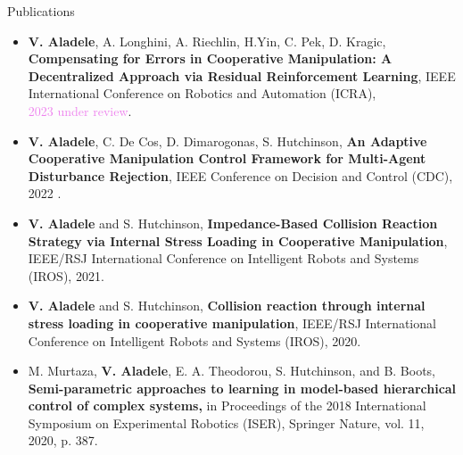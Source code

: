 \documentclass{resume} %
\begin{document}
\begin{rSection}{Publications}
\begin{itemize}
\item \textbf{V. Aladele}, A. Longhini, A. Riechlin, H.Yin, C. Pek, D. Kragic, \textbf{Compensating for Errors in Cooperative Manipulation: A Decentralized Approach via Residual Reinforcement Learning}, IEEE International Conference on Robotics and Automation (ICRA),\\ \textcolor{violet}{2023 under review}.

\item \textbf{V. Aladele}, C. De Cos, D. Dimarogonas, S. Hutchinson, \textbf{An Adaptive Cooperative Manipulation Control Framework for Multi-Agent Disturbance Rejection}, IEEE Conference on Decision and Control (CDC), 2022 .

\item \textbf{V. Aladele} and S. Hutchinson, \textbf{Impedance-Based Collision Reaction Strategy via Internal Stress Loading in Cooperative Manipulation}, IEEE/RSJ International Conference on Intelligent Robots and Systems (IROS), 2021.

\item \textbf{V. Aladele} and S. Hutchinson, \textbf{Collision reaction through internal stress loading in cooperative manipulation}, IEEE/RSJ International Conference on Intelligent Robots and Systems (IROS), 2020.

\item M. Murtaza, \textbf{V. Aladele}, E. A. Theodorou, S. Hutchinson, and B. Boots, \textbf{Semi-parametric approaches to learning in model-based hierarchical control of complex
systems,} in Proceedings of the 2018 International Symposium on Experimental
Robotics (ISER), Springer Nature, vol. 11, 2020, p. 387.
\end{itemize}
\end{rSection}

\end{document}
